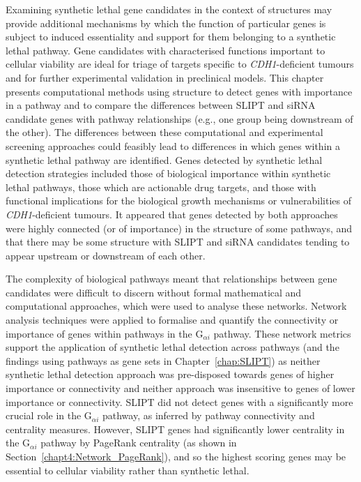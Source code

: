Examining \gls{synthetic lethal} gene candidates in the context of  structures may provide additional mechanisms by which the function of particular genes is subject to \gls{induced essentiality} and support for them belonging to a \gls{synthetic lethal} \gls{pathway}. Gene candidates with characterised functions important to cellular viability are ideal for triage of targets specific to \textit{CDH1}-deficient tumours and for further experimental validation in preclinical models.
This chapter presents computational methods using  structure to detect genes with importance in a \gls{pathway} and to compare the differences between \gls{SLIPT} and \gls{siRNA} candidate genes with \gls{pathway} relationships (e.g., one group being downstream of the other). 
%
The differences between these computational and experimental screening approaches could feasibly lead to differences in which genes within a \gls{synthetic lethal} \gls{pathway} are identified. Genes detected by \gls{synthetic lethal} detection strategies included those of biological importance within \gls{synthetic lethal} \glspl{pathway}, those which are actionable drug targets, and those with functional implications for the biological growth mechanisms or vulnerabilities of \textit{CDH1}-deficient tumours. It appeared that genes detected by both approaches were highly connected (or of importance) in the  structure of some \glspl{pathway}, and that there may be some structure with \gls{SLIPT} and \gls{siRNA} candidates tending to appear upstream or downstream of each other. 

The complexity of biological \glspl{pathway} meant that relationships between gene candidates were difficult to discern without formal mathematical and computational approaches, which were used to analyse these networks. Network analysis techniques were applied to formalise and quantify the connectivity or importance of genes within \glspl{pathway} in the G$_{\alpha i}$ \gls{pathway}. 
These network metrics support the application of \gls{synthetic lethal} detection across \glspl{pathway} (and the findings using \glspl{pathway} as gene sets in Chapter~\ref{chap:SLIPT}) as neither \gls{synthetic lethal} detection approach was pre-disposed towards genes of higher importance or connectivity and neither approach was insensitive to genes of lower importance or connectivity. \gls{SLIPT} did not detect genes with a significantly more crucial role in the G$_{\alpha i}$ \gls{pathway}, as inferred by \gls{pathway} connectivity and \gls{centrality} measures. However, \gls{SLIPT} genes had significantly lower centrality in the G$_{\alpha i}$ \gls{pathway} by \gls{PageRank centrality} (as shown in Section~\ref{chapt4:Network_PageRank}), and so the highest scoring genes may be \gls{essential} to cellular viability rather than \gls{synthetic lethal}. 

